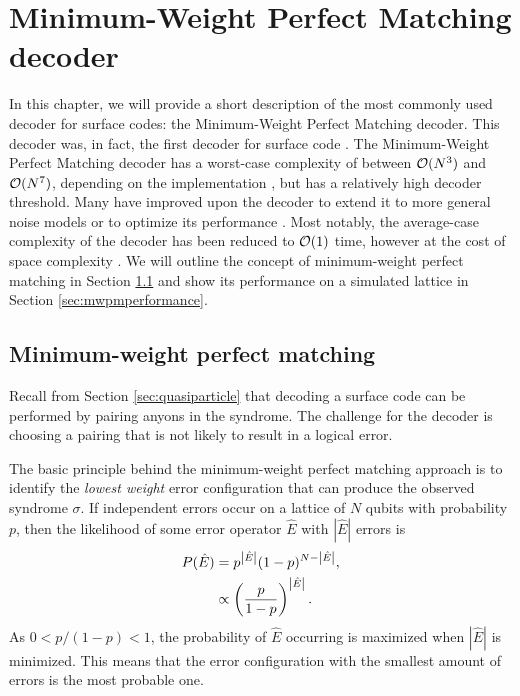 
\chapter{Minimum-Weight Perfect Matching decoder}\label{ch:mwpm}

In this chapter, we will provide a short description of the most commonly used decoder for surface codes: the Minimum-Weight Perfect Matching decoder. This decoder was, in fact, the first decoder for surface code \cite{dennis2002topological}. The Minimum-Weight Perfect Matching decoder has a worst-case complexity of between $\mathcal{O}(N^3)$ and $\mathcal{O}(N^7)$, depending on the implementation \cite{edmonds1965paths, kolmogorov2009blossom}, but has a relatively high decoder threshold. Many have improved upon the decoder to extend it to more general noise models or to optimize its performance \cite{fowler2012towards, fowler2012surface, fowler2013optimal, stace2009thresholds, stace2010error}. Most notably, the average-case complexity of the decoder has been reduced to $\mathcal{O}(1)$ time, however at the cost of space complexity \cite{fowler2013minimum}. We will outline the concept of minimum-weight perfect matching in Section \ref{sec:mwpm} and show its performance on a simulated lattice in Section \ref{sec:mwpmperformance}.

\section{Minimum-weight perfect matching}\label{sec:mwpm}

Recall from Section \ref{sec:quasiparticle} that decoding a surface code can be performed by pairing anyons in the syndrome. The challenge for the decoder is choosing a pairing that is not likely to result in a logical error. 

The basic principle behind the minimum-weight perfect matching approach is to identify the \emph{lowest weight} error configuration that can produce the observed syndrome $\sigma$. If independent errors occur on a lattice of $N$ qubits with probability $p$, then the likelihood of some error operator $\hat{E}$ with $|\hat{E}|$ errors is
\begin{align}
  P(\hat{E}) &= p^{\abs{\hat{E}}}(1-p)^{N-\abs{\hat{E}}}, \\
             &\propto \left(\frac{p}{1-p}\right)^\abs{\hat{E}}.
\end{align}
As $0<p/(1-p)<1$, the probability of $\hat{E}$ occurring is maximized when $|\hat{E}|$ is minimized. This means that the error configuration with the smallest amount of errors is the most probable one. 

